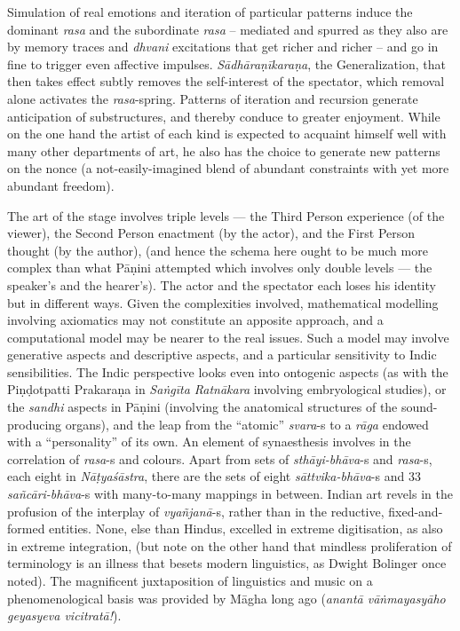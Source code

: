 Simulation of real emotions and iteration of particular patterns induce the dominant \textsl{rasa} and the subordinate \textsl{rasa} -- mediated and spurred as they also are by memory traces and \textsl{dhvani} excitations that get richer and richer -- and go in fine to trigger even affective impulses. \textsl{Sādhāraṇīkaraṇa}, the Generalization, that then takes effect subtly removes the self-interest of the spectator, which removal alone activates the \textsl{rasa}-spring. Patterns of iteration and recursion generate anticipation of substructures, and thereby conduce to greater enjoyment. While on the one hand the artist of each kind is expected to acquaint himself well with many other departments of art, he also has the choice to generate new patterns on the nonce (a not-easily-imagined blend of abundant constraints with yet more abundant freedom).

The art of the stage involves triple levels --- the Third Person experience (of the viewer), the Second Person enactment (by the actor), and the First Person thought (by the author), (and hence the schema here ought to be much more complex than what Pāṇini attempted which involves only double levels --- the speaker’s and the hearer’s). The actor and the spectator each loses his identity but in different ways. Given the complexities involved, mathematical modelling involving axiomatics may not constitute an apposite approach, and a computational  model may be nearer to the real issues. Such a model may involve generative aspects and descriptive aspects, and a particular sensitivity to Indic sensibilities. The Indic perspective looks even into ontogenic aspects (as with the Piṇḍotpatti Prakaraṇa in \textsl{Saṅgīta Ratnākara} involving embryological studies), or the \textsl{sandhi} aspects in Pāṇini (involving the anatomical structures of the sound-producing organs), and the leap from the “atomic” \textsl{svara}-s to a \textsl{rāga} endowed with a “personality” of its own. An element of synaesthesis involves in the correlation of \textsl{rasa}-s and colours. Apart from sets of \textsl{sthāyi-bhāva}-s and \textsl{rasa}-s, each eight in \textsl{Nāṭyaśāstra}, there are the sets of eight \textsl{sāttvika-bhāva}-s and 33 \textsl{sañcāri-bhāva}-s with many-to-many mappings in between. Indian art revels in the profusion of the interplay of \textsl{vyañjanā}-s, rather than in the reductive, fixed-and-formed entities. None, else than Hindus, excelled in extreme digitisation, as also in extreme integration, (but note on the other hand that mindless proliferation of terminology is an illness that besets modern linguistics, as Dwight Bolinger once noted). The magnificent juxtaposition of linguistics and music on a phenomenological basis was provided by Māgha long ago (\textsl{anantā vāṅmayasyāho geyasyeva vicitratā!}).
 
